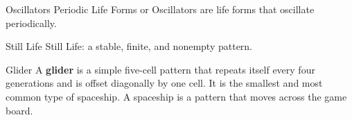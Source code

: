 \begin{frame}{Oscillators}
Periodic Life Forms or Oscillators are life forms that oscillate periodically.
  \begin{center}
    \end{center}
\end{frame}


\begin{frame}{Still Life}
Still Life: a stable, finite, and nonempty pattern.
  \vfill
    \begin{center}
    \end{center}
\end{frame}

\begin{frame}{Glider}
A \textbf{glider} is a simple five-cell pattern that repeats itself every four generations and is offset diagonally by one cell. It is the smallest and most common type of spaceship. A spaceship is a pattern that moves across the game board.
  \vfill
    \begin{center}
    \end{center}
\end{frame}

